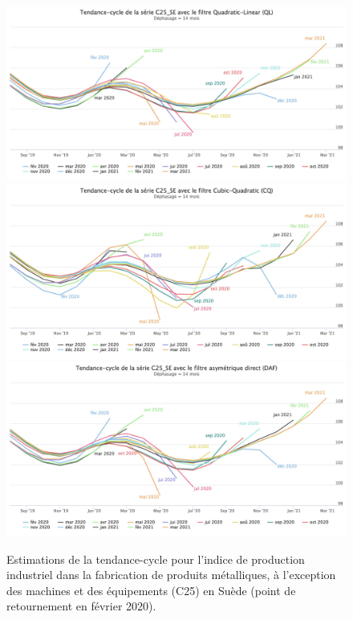 \documentclass[
  11pt,
  french,
  a4paper]{article}
\newcommand\1{\mathds{1}}
\begin{document}
\begin{figure}[H]

{\centering \includegraphics[width=0.9\linewidth,]{img/simulations/c25_se_ql} \includegraphics[width=0.9\linewidth,]{img/simulations/c25_se_cq} \includegraphics[width=0.9\linewidth,]{img/simulations/c25_se_daf} 

}

\caption[Estimations de la tendance-cycle pour l'indice de production industriel dans la fabrication de produits métalliques, à l'exception des machines et des équipements (C25) en Suède (point de retournement en février 2020)]{Estimations de la tendance-cycle pour l'indice de production industriel dans la fabrication de produits métalliques, à l'exception des machines et des équipements (C25) en Suède (point de retournement en février 2020).}\label{fig:c25sep2}

\footnotesize
\normalsize\end{figure}
\end{document}
